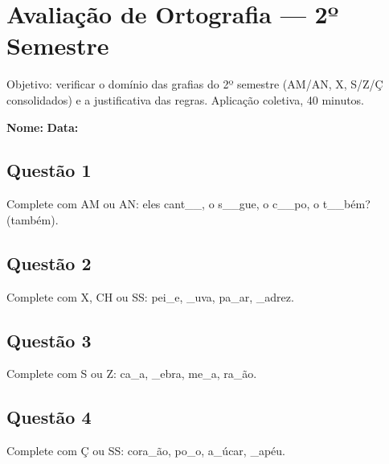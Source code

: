 \clearpage

\section{Avaliação de Ortografia — 2º Semestre}

\begin{avaliacao}
Objetivo: verificar o domínio das grafias do 2º semestre (AM/AN, X, S/Z/Ç consolidados) e a justificativa das regras. Aplicação coletiva, 40 minutos.
\end{avaliacao}

\noindent\textbf{Nome:} \underline{\hspace{4cm}} \quad \textbf{Data:} \underline{\hspace{2cm}}

\subsection*{Questão 1}
Complete com AM ou AN: eles cant\_\_, o s\_\_gue, o c\_\_po, o t\_\_bém? (também).

\begin{center}
  \underline{\hspace{12cm}}
\end{center}

\subsection*{Questão 2}
Complete com X, CH ou SS: pei\_e, \_uva, pa\_ar, \_adrez.

\begin{center}
  \underline{\hspace{12cm}}
\end{center}

\subsection*{Questão 3}
Complete com S ou Z: ca\_a, \_ebra, me\_a, ra\_ão.

\begin{center}
  \underline{\hspace{12cm}}
\end{center}

\subsection*{Questão 4}
Complete com Ç ou SS: cora\_ão, po\_o, a\_úcar, \_apéu.

